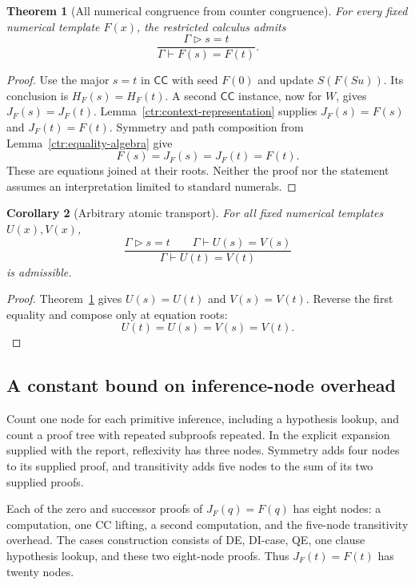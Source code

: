 \documentclass[11pt,letterpaper]{article}
\newtheorem{theorem}{Theorem}[section]
\newtheorem{corollary}[theorem]{Corollary}
\theoremstyle{definition}\newtheorem{definition}[theorem]{Definition}
\theoremstyle{remark}\newtheorem{remark}[theorem]{Remark}
\begin{document}
\begin{theorem}[All numerical congruence from counter congruence]
\label{ctr:all-congruence}
For every fixed numerical template $F(x)$, the restricted calculus admits
\[
 \frac{\Gamma\mathrel{\triangleright}s=t}
      {\Gamma\vdash F(s)=F(t)}.
 \tag{Numerical congruence}
\]
\end{theorem}
\begin{proof}
Use the major $s=t$ in $\mathsf{CC}$ with seed $F(0)$ and update
$S(F(Su))$. Its conclusion is $H_F(s)=H_F(t)$. A second
$\mathsf{CC}$ instance, now for $W$, gives
$J_F(s)=J_F(t)$. Lemma~\ref{ctr:context-representation} supplies
$J_F(s)=F(s)$ and $J_F(t)=F(t)$. Symmetry and path composition from
Lemma~\ref{ctr:equality-algebra} give
\[
                F(s)=J_F(s)=J_F(t)=F(t).
\]
These are equations joined at their roots. Neither the proof nor the
statement assumes an interpretation limited to standard numerals.
\end{proof}

\begin{corollary}[Arbitrary atomic transport]
\label{ctr:atomic-transport}
For all fixed numerical templates $U(x),V(x)$,
\[
 \frac{\Gamma\mathrel{\triangleright}s=t\qquad
       \Gamma\vdash U(s)=V(s)}
      {\Gamma\vdash U(t)=V(t)}
 \tag{Atomic transport}
\]
is admissible.
\end{corollary}
\begin{proof}
Theorem~\ref{ctr:all-congruence} gives $U(s)=U(t)$ and $V(s)=V(t)$.
Reverse the first equality and compose only at equation roots:
\[
                U(t)=U(s)=V(s)=V(t).
\]
\end{proof}

\subsection{A constant bound on inference-node overhead}

Count one node for each primitive inference, including a hypothesis
lookup, and count a proof tree with repeated subproofs repeated. In the
explicit expansion supplied with the report, reflexivity has three
nodes. Symmetry adds four nodes to its supplied proof, and transitivity
adds five nodes to the sum of its two supplied proofs.

Each of the zero and successor proofs of $J_F(q)=F(q)$ has eight
nodes: a computation, one CC lifting, a second computation, and the
five-node transitivity overhead. The cases construction consists of
DE, DI-case, QE, one clause hypothesis lookup, and these two eight-node
proofs. Thus $J_F(t)=F(t)$ has twenty nodes.
\end{document}

